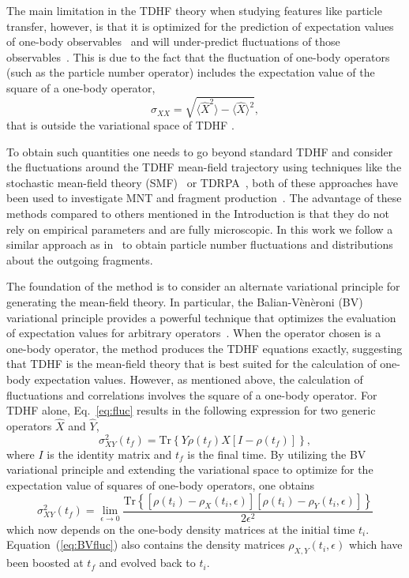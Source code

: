 The main limitation in the TDHF theory when studying features like particle transfer, however, is that it is optimized for the prediction of expectation values of one-body observables~\citep{balian1981} and will under-predict fluctuations of those observables~\citep{dasso1979}. 
This is due to the fact that the fluctuation of one-body operators (such as the particle number operator) includes the expectation value of the square of a one-body operator,
\begin{equation}
\sigma_{XX}=\sqrt{\langle\hat{X}^2\rangle - \langle\hat{X}\rangle^2},
\label{eq:fluc}
\end{equation}
that is outside the variational space of TDHF \citep{balian1981}.

To obtain such quantities one needs to go beyond standard TDHF and consider the fluctuations around the TDHF mean-field trajectory using techniques like the stochastic mean-field theory (SMF)~\citep{ayik2008,lacroix2014} or TDRPA~\citep{balian1984}, both of these approaches have been used to investigate MNT and fragment production~\citep{ayik2016,ayik2017,ayik2018,ayik2019,ayik2019b,marston1985,bonche1985,broomfield2008,broomfield2009,simenel2011,williams2018}.
The advantage of these methods compared to others mentioned in the Introduction is that they do not rely on 
empirical parameters and are fully microscopic.
In this work we follow a similar approach as in~\citep{simenel2011,williams2018} to obtain particle number fluctuations and distributions about the outgoing fragments.

The foundation of the method is to consider an alternate variational principle for generating the mean-field theory.
In particular, the Balian-V\`en\`eroni (BV) variational principle provides a powerful technique that optimizes the evaluation of expectation values for arbitrary operators~\citep{balian1984,bonche1985}.
When the operator chosen is a one-body operator, the method produces the TDHF equations exactly, suggesting that TDHF is the mean-field theory that is best suited for the calculation of one-body expectation values.
However, as mentioned above, the calculation of fluctuations and correlations involves the square of a one-body operator.
For TDHF alone, Eq.~\ref{eq:fluc} results in the following expression for two generic operators $\hat{X}$ and $\hat{Y}$,
\begin{equation}
\sigma_{XY}^2(t_f)=\mathrm{Tr}\left\{Y\rho(t_f)X[I-\rho(t_f)] \right\},
\end{equation}
where $I$ is the identity matrix and $t_f$ is the final time.
By utilizing the BV variational principle and extending the variational space to optimize for the expectation value of squares of one-body operators, one obtains
\begin{equation}
\sigma_{XY}^2(t_f)=\lim_{\epsilon\rightarrow0}\frac{\mathrm{Tr}\left\{[\rho(t_i)-\rho_X(t_i,\epsilon)][\rho(t_i)-\rho_Y(t_i,\epsilon)]\right\}}{2\epsilon^2}
\label{eq:BVfluc}
\end{equation}
which now depends on the one-body density matrices at the initial time $t_i$.
Equation~(\ref{eq:BVfluc}) also contains the density matrices $\rho_{X,Y}(t_i,\epsilon)$ which have been boosted at $t_f$ and evolved back to $t_i$.

